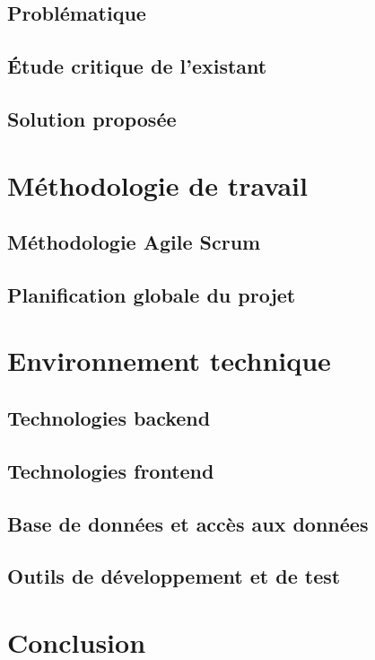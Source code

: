 \documentclass[12pt,a4paper]{report}
\begin{document}
\subsection{Problématique}
\subsection{Étude critique de l'existant}
\subsection{Solution proposée}

\section{Méthodologie de travail}
\subsection{Méthodologie Agile Scrum}
\subsection{Planification globale du projet}

\section{Environnement technique}
\subsection{Technologies backend}
\subsection{Technologies frontend}
\subsection{Base de données et accès aux données}
\subsection{Outils de développement et de test}

\section{Conclusion}

\end{document}
